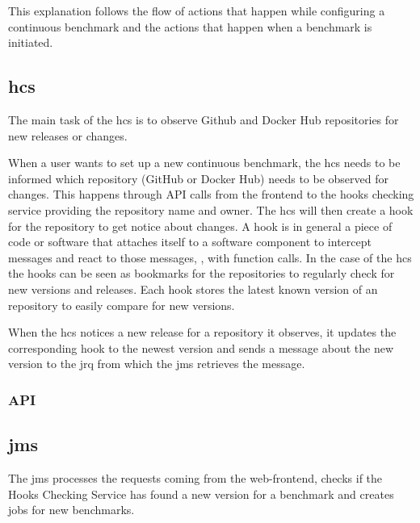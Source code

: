This explanation follows the flow of actions that happen while configuring a continuous benchmark and the actions that happen when a benchmark is initiated.


\subsection{\acl{hcs}}
\label{sec:hooks_checking_service}
The main task of the \ac{hcs} is to observe Github and Docker Hub repositories for new releases or changes.

When a user wants to set up a new continuous benchmark, the \ac{hcs} needs to be informed which repository (GitHub or Docker Hub) needs to be observed for changes.
This happens through API calls from the frontend to the hooks checking service providing the repository name and owner.
The \ac{hcs} will then create a hook for the repository to get notice about changes.
A hook is in general a piece of code or software that attaches itself to a software component to intercept messages and react to those messages, \eg, with function calls.
In the case of the \ac{hcs} the hooks can be seen as bookmarks for the repositories to regularly check for new versions and releases.
Each hook stores the latest known version of an repository to easily compare for new versions.

When the \ac{hcs} notices a new release for a repository it observes, it updates the corresponding hook to the newest version and sends a message about the new version to the \acl{jrq} from which the \acl{jms} retrieves the message.

\subsubsection{API}
\label{sec:hooks_api}


\subsection{\acl{jms}}
\label{sec:jobs_managing_service}
The \acf{jms} processes the requests coming from the web-frontend, checks if the Hooks Checking Service has found a new version for a benchmark and creates jobs for new benchmarks.





